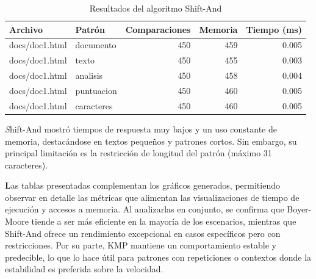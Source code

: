 \documentclass[9pt,letterpaper,onecolumn]{rho-class/rho}
\begin{document}
\vspace{1em}

\begin{table}[H]
\centering
\caption{Resultados del algoritmo Shift-And}
\label{tab:shiftand}
\begin{tabular}{|l|l|r|r|r|}
\hline
\textbf{Archivo} & \textbf{Patrón} & \textbf{Comparaciones} & \textbf{Memoria} & \textbf{Tiempo (ms)} \\
\hline
docs/doc1.html & documento & 450 & 459 & 0.005 \\
docs/doc1.html & texto & 450 & 455 & 0.003 \\
docs/doc1.html & analisis & 450 & 458 & 0.004 \\
docs/doc1.html & puntuacion & 450 & 460 & 0.005 \\
docs/doc1.html & caracteres & 450 & 460 & 0.005 \\
\hline
\end{tabular}
\end{table}

\vspace{0.5em}
\noindent\textit Shift-And mostró tiempos de respuesta muy bajos y un uso constante de memoria, destacándose en textos pequeños y patrones cortos. Sin embargo, su principal limitación es la restricción de longitud del patrón (máximo 31 caracteres).

\vspace{1em}

\noindent\textbf Las tablas presentadas complementan los gráficos generados, permitiendo observar en detalle las métricas que alimentan las visualizaciones de tiempo de ejecución y accesos a memoria. Al analizarlas en conjunto, se confirma que Boyer-Moore tiende a ser más eficiente en la mayoría de los escenarios, mientras que Shift-And ofrece un rendimiento excepcional en casos específicos pero con restricciones. Por su parte, KMP mantiene un comportamiento estable y predecible, lo que lo hace útil para patrones con repeticiones o contextos donde la estabilidad es preferida sobre la velocidad.



\end{document}

